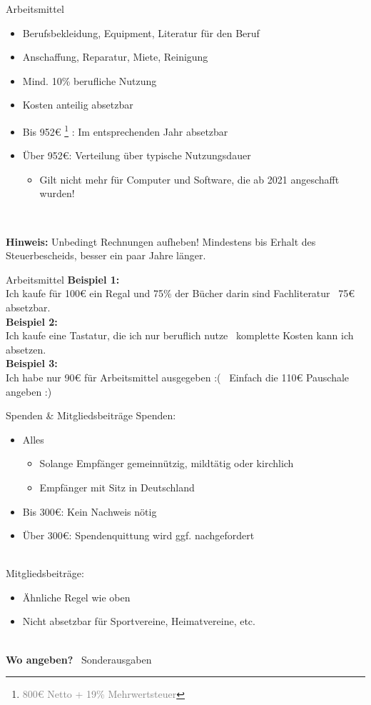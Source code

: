 \documentclass{beamer}
\newcommand{\n}{\hfill\\\vspace{0.25cm}}
\let\oldfootnote\footnote
\renewcommand{\footnote}[1]
{%
	\oldfootnote
	{
		\tiny
		\textcolor{gray}{#1}
	}%
}
\begin{document}
			\begin{frame}{Arbeitsmittel}
				\begin{itemize}
					\item Berufsbekleidung, Equipment, Literatur für den Beruf
					\item Anschaffung, Reparatur, Miete, Reinigung
					\item Mind. 10\% berufliche Nutzung
					\item Kosten anteilig absetzbar
					\item Bis 952€\footnote{800€ Netto + 19\% Mehrwertsteuer}: Im entsprechenden Jahr absetzbar
					\item Über 952€: Verteilung über typische Nutzungsdauer
					\begin{itemize}
						\item Gilt nicht mehr für Computer und Software, die ab 2021 angeschafft wurden!
					\end{itemize}
				\end{itemize}\n
			
				\textbf{Hinweis:} Unbedingt Rechnungen aufheben! Mindestens bis Erhalt des Steuerbescheids, besser ein paar Jahre länger.
			\end{frame}
		
			\begin{frame}{Arbeitsmittel}
				\textbf{Beispiel 1:}\\
				Ich kaufe für 100€ ein Regal und 75\% der Bücher darin sind Fachliteratur \textrightarrow\ 75€ absetzbar.\n
				\textbf{Beispiel 2:}\\
				Ich kaufe eine Tastatur, die ich nur beruflich nutze \textrightarrow\ komplette Kosten kann ich absetzen.\n
				\textbf{Beispiel 3:}\\
				Ich habe nur 90€ für Arbeitsmittel ausgegeben :( \textrightarrow\ Einfach die 110€ Pauschale angeben :)
			\end{frame}
		
			\begin{frame}{Spenden \& Mitgliedsbeiträge}
				Spenden:
				\begin{itemize}
					\item Alles
					\begin{itemize}
						\item Solange Empfänger gemeinnützig, mildtätig oder kirchlich
						\item Empfänger mit Sitz in Deutschland
					\end{itemize}
					\item Bis 300€: Kein Nachweis nötig
					\item Über 300€: Spendenquittung wird ggf. nachgefordert
				\end{itemize}\n
				Mitgliedsbeiträge:
				\begin{itemize}
					\item Ähnliche Regel wie oben
					\item Nicht absetzbar für Sportvereine, Heimatvereine, etc.
				\end{itemize}\n
				\textbf{Wo angeben?} \textrightarrow\ Sonderausgaben
			\end{frame}
		
\end{document}
